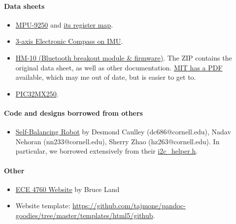\documentclass[]{article}
\providecommand{\tightlist}{%
  \setlength{\itemsep}{0pt}\setlength{\parskip}{0pt}}
\let\oldparagraph\paragraph
\renewcommand{\paragraph}[1]{\oldparagraph{#1}\mbox{}}
\begin{document}
\hypertarget{data-sheets}{%
\paragraph{Data sheets}\label{data-sheets}}

\begin{itemize}
\tightlist
\item
  \href{https://www.invensense.com/wp-content/uploads/2015/02/PS-MPU-9250A-01-v1.1.pdf}{MPU-9250}
  and
  \href{https://cdn.sparkfun.com/assets/learn_tutorials/5/5/0/MPU-9250-Register-Map.pdf}{its
  register map}.
\item
  \href{https://www.akm.com/akm/en/file/datasheet/AK8963C.pdf}{3-axis
  Electronic Compass on IMU}.
\item
  \href{http://www.jnhuamao.cn/bluetooth40_en.zip}{HM-10 (Bluetooth
  breakout module \& firmware)}. The ZIP contains the original data
  sheet, as well as other documentation.
  \href{http://fab.cba.mit.edu/classes/863.15/doc/tutorials/programming/bluetooth/bluetooth40_en.pdf}{MIT
  has a PDF} available, which may me out of date, but is easier to get
  to.
\item
  \href{http://ww1.microchip.com/downloads/en/DeviceDoc/60001168J.pdf}{PIC32MX250}.
\end{itemize}

\hypertarget{code-and-designs-borrowed-from-others}{%
\paragraph{Code and designs borrowed from
others}\label{code-and-designs-borrowed-from-others}}

\begin{itemize}
\tightlist
\item
  \href{https://people.ece.cornell.edu/land/courses/ece4760/FinalProjects/f2015/dc686_nn233_hz263/final_project_webpage_v2/dc686_nn233_hz263/index.html}{Self-Balancing
  Robot} by Desmond Caulley (dc686@cornell.edu), Nadav Nehoran
  (nn233@cornell.edu), Sherry Zhao (hz263@cornell.edu). In particular,
  we borrowed extensively from their
  \href{https://people.ece.cornell.edu/land/courses/ece4760/FinalProjects/f2015/dc686_nn233_hz263/final_project_webpage_v2/dc686_nn233_hz263/dc686_nn233_hz263/i2c_helper.h}{i2c\_helper.h}.
\end{itemize}

\hypertarget{other}{%
\paragraph{Other}\label{other}}

\begin{itemize}
\tightlist
\item
  \href{http://people.ece.cornell.edu/land/courses/ece4760/}{ECE 4760
  Website} by Bruce Land
\item
  Website template:
  \url{https://github.com/tajmone/pandoc-goodies/tree/master/templates/html5/github}.
\end{itemize}
\end{document}
